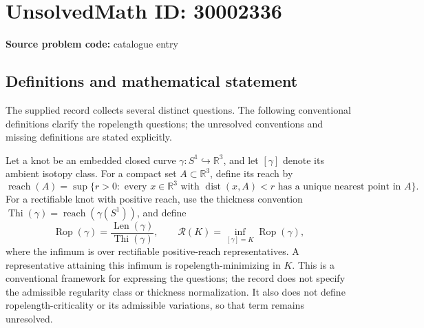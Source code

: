 \documentclass[11pt]{article}
\newcommand{\R}{\mathbb{R}}
\begin{document}
\section*{UnsolvedMath ID: 30002336}
\textbf{Source problem code:} catalogue entry
\subsection{Definitions and mathematical statement}
The supplied record collects several distinct questions. The following conventional definitions clarify the ropelength questions; the unresolved conventions and missing definitions are stated explicitly.

Let a knot be an embedded closed curve \(\gamma\colon S^1\hookrightarrow\R^3\), and let \([\gamma]\) denote its ambient isotopy class. For a compact set \(A\subset\R^3\), define its reach by
\[
\operatorname{reach}(A)=\sup\{r>0:\text{ every }x\in\R^3\text{ with }\operatorname{dist}(x,A)<r\text{ has a unique nearest point in }A\}.
\]
For a rectifiable knot with positive reach, use the thickness convention \(\operatorname{Thi}(\gamma)=\operatorname{reach}(\gamma(S^1))\), and define
\[
\operatorname{Rop}(\gamma)=\frac{\operatorname{Len}(\gamma)}{\operatorname{Thi}(\gamma)},\qquad
\mathcal R(K)=\inf_{[\gamma]=K}\operatorname{Rop}(\gamma),
\]
where the infimum is over rectifiable positive-reach representatives. A representative attaining this infimum is ropelength-minimizing in \(K\). This is a conventional framework for expressing the questions; the record does not specify the admissible regularity class or thickness normalization. It also does not define ropelength-criticality or its admissible variations, so that term remains unresolved.
\end{document}
